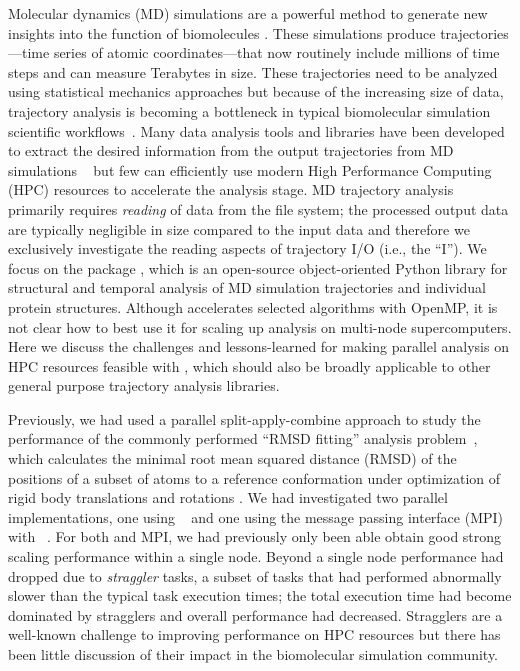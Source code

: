 \label{sec:introduction}
Molecular dynamics (MD) simulations are a powerful method to generate new insights into the function of biomolecules \cite{Borhani:2012mi, Dror:2012cr, Orozco:2014dq, Perilla:2015kx, Bottaro:2018aa}.
These simulations produce trajectories---time series of atomic coordinates---that now routinely include millions of time steps and can measure Terabytes in size.
These trajectories need to be analyzed using statistical mechanics approaches \cite{Tuckerman:2010cr, Mura:2014kx} but because of the increasing size of data, trajectory analysis is becoming a bottleneck in typical biomolecular simulation scientific workflows~\cite{Cheatham:2015}.
Many data analysis tools and libraries have been developed to extract the desired information from the output trajectories from MD simulations ~\cite{nmoldyn, nmoldyn-2012, Hum96, Hinsen:2000kx, Grant:2006ud, himach-2008, Romo:2009zr, Romo:2014bh, Michaud-Agrawal:2011fu, Gowers:2016aa, cpptraj-2013, McGibbon:2015aa, pteros2015, Doerr:2016aa} but few can efficiently use modern High Performance Computing (HPC) resources to accelerate the analysis stage.
MD trajectory analysis primarily requires \emph{reading} of data from the file system; the processed output data are typically negligible in size compared to the input data and therefore we exclusively investigate the reading aspects of trajectory I/O (i.e., the ``I'').
We focus on the  package \cite{Gowers:2016aa,Michaud-Agrawal:2011fu}, which is an open-source object-oriented Python library for structural and temporal analysis of MD simulation trajectories and individual protein structures.
Although  accelerates selected algorithms with OpenMP, it is not clear how to best use it for scaling up analysis on multi-node supercomputers.
Here we discuss the challenges and lessons-learned for making parallel analysis on HPC resources feasible with , which should also be broadly applicable to other general purpose trajectory analysis libraries.

Previously, we had used a parallel split-apply-combine  approach to study the performance of the commonly performed ``RMSD fitting'' analysis problem~\cite{Khoshlessan:2017ab, ICCP-2018}, which calculates the minimal root mean squared distance (RMSD) of the positions of a subset of atoms to a reference conformation under optimization of rigid body translations and rotations \cite{Liu:2010kx, Lea96, Mura:2014kx}.
We had investigated two parallel implementations, one using ~\cite{Rocklin:2015aa} and one using the message passing interface (MPI) with ~\cite{Dalcin:2011aa, Dalcin:2005aa}. 
For both  and MPI, we had previously only been able obtain good strong scaling performance within a single node.
Beyond a single node performance had dropped due to \emph{straggler} tasks, a subset of tasks that had performed abnormally slower than the typical task execution times; the total execution time had become dominated by stragglers and overall performance had decreased.
Stragglers are a well-known challenge to improving performance on HPC resources \cite{Garraghan2016} but there has been little discussion of their impact in the biomolecular simulation community.

